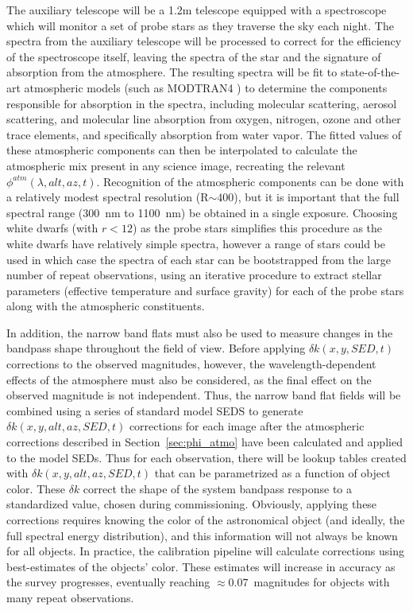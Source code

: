 \documentclass[12pt,preprint]{aastex}
\begin{document}
The auxiliary telescope will be a 1.2m telescope equipped with a
spectroscope which will monitor a set of probe stars as they traverse
the sky each night. The spectra from the auxiliary telescope will be
processed to correct for the efficiency of the spectroscope itself,
leaving the spectra of the star and the signature of absorption from
the atmosphere. The resulting spectra will be fit to state-of-the-art
atmospheric models (such as MODTRAN4 \citep{modtran4a, modtran4b}) to determine
the components responsible for absorption in the spectra, including
molecular scattering, aerosol scattering, and molecular line
absorption from oxygen, nitrogen, ozone and other trace elements, and
specifically absorption from water vapor. The fitted values of these
atmospheric components can then be interpolated to calculate the
atmospheric mix present in any science image, recreating the relevant
$\phi^{atm}(\lambda,alt,az,t)$. Recognition of the atmospheric
components can be done with a relatively modest spectral resolution
(R$\sim400$), but it is important that the full spectral range (300~nm
to 1100~nm) be obtained in a single exposure. Choosing white dwarfs
(with $r<12$) as the probe stars simplifies this procedure as the
white dwarfs have relatively simple spectra, however a range of stars
could be used in which case the spectra of each star can be
bootstrapped from the large number of repeat observations, using an
iterative procedure to extract stellar parameters (effective
temperature and surface gravity) for each of the probe stars along
with the atmospheric constituents.





In addition, the narrow band flats must also be used to measure
changes in the bandpass shape throughout the field of view. Before
applying $\delta k(x,y,SED,t)$ corrections to the observed magnitudes,
however, the wavelength-dependent effects of the atmosphere must also
be considered, as the final effect on the observed magnitude is not
independent. Thus, the narrow band flat fields will be combined using
a series of standard model SEDS to generate $\delta
k(x,y,alt,az,SED,t)$ corrections for each image after the atmospheric
corrections described in Section~\ref{sec:phi_atmo} have been
calculated and applied to the model SEDs. Thus for each observation,
there will be lookup tables created with $\delta k(x,y,alt,az,SED,t)$
that can be parametrized as a function of object color. These $\delta
k$ correct the shape of the system bandpass response to a standardized
value, chosen during commissioning.  Obviously, applying these
corrections requires knowing the color of the astronomical object (and
ideally, the full spectral energy distribution), and this information
will not always be known for all objects. In practice, the calibration
pipeline will calculate corrections using best-estimates of the
objects' color. These estimates will increase in accuracy as the
survey progresses, eventually reaching $\approx 0.07$~magnitudes for
objects with many repeat observations.
\end{document}
